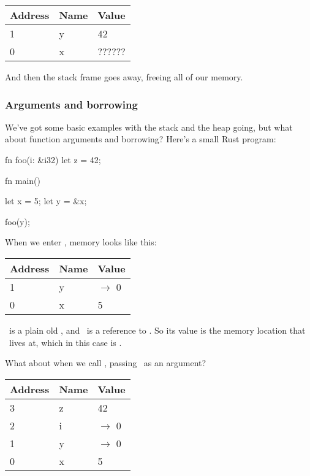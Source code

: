 \begin{table}[H]
  \begin{tabular}{|l|l|l|}
    \hline
    \textbf{Address} & \textbf{Name} & \textbf{Value} \\
    \hline
    1 & y & 42 \\
    \hline
    0 & x & ?????? \\
    \hline
  \end{tabular}
\end{table}

And then the stack frame goes away, freeing all of our memory.

\subsubsection*{Arguments and borrowing}

We've got some basic examples with the stack and the heap going, but what about function arguments and borrowing? Here's a small 
Rust program:

\begin{rustc}
fn foo(i: &i32) {
    let z = 42;
}

fn main() {
    let x = 5;
    let y = &x;

    foo(y);
}
\end{rustc}

When we enter , memory looks like this:

\begin{table}[H]
  \begin{tabular}{|l|l|l|}
    \hline
    \textbf{Address} & \textbf{Name} & \textbf{Value} \\
    \hline
    1 & y & $\rightarrow$ 0 \\
    \hline
    0 & x & 5 \\
    \hline
  \end{tabular}
\end{table}

\x\ is a plain old , and \y\ is a reference to \x. So its value is the memory location that \x\ lives at, which in this 
case is .

\blank

What about when we call , passing \y\ as an argument?

\begin{table}[H]
  \begin{tabular}{|l|l|l|}
    \hline
    \textbf{Address} & \textbf{Name} & \textbf{Value} \\
    \hline
    3 & z & 42 \\
    \hline
    2 & i & $\rightarrow$ 0 \\
    \hline
    1 & y & $\rightarrow$ 0 \\
    \hline
    0 & x & 5 \\
    \hline
  \end{tabular}
\end{table}

